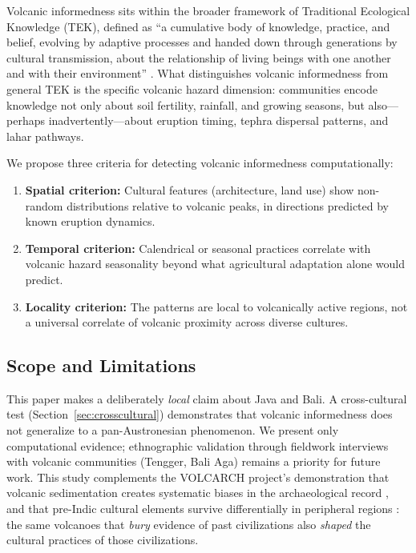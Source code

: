 \documentclass[12pt,a4paper]{article}
\begin{document}
Volcanic informedness sits within the broader framework of Traditional Ecological Knowledge (TEK), defined as ``a cumulative body of knowledge, practice, and belief, evolving by adaptive processes and handed down through generations by cultural transmission, about the relationship of living beings with one another and with their environment'' \citep{berkes2018}. What distinguishes volcanic informedness from general TEK is the specific volcanic hazard dimension: communities encode knowledge not only about soil fertility, rainfall, and growing seasons, but also---perhaps inadvertently---about eruption timing, tephra dispersal patterns, and lahar pathways.

We propose three criteria for detecting volcanic informedness computationally:
\begin{enumerate}
    \item \textbf{Spatial criterion:} Cultural features (architecture, land use) show non-random distributions relative to volcanic peaks, in directions predicted by known eruption dynamics.
    \item \textbf{Temporal criterion:} Calendrical or seasonal practices correlate with volcanic hazard seasonality beyond what agricultural adaptation alone would predict.
    \item \textbf{Locality criterion:} The patterns are local to volcanically active regions, not a universal correlate of volcanic proximity across diverse cultures.
\end{enumerate}

\subsection{Scope and Limitations}

This paper makes a deliberately \emph{local} claim about Java and Bali. A cross-cultural test (Section~\ref{sec:crosscultural}) demonstrates that volcanic informedness does not generalize to a pan-Austronesian phenomenon. We present only computational evidence; ethnographic validation through fieldwork interviews with volcanic communities (Tengger, Bali Aga) remains a priority for future work. This study complements the VOLCARCH project's demonstration that volcanic sedimentation creates systematic biases in the archaeological record \citep{amien2026p1}, and that pre-Indic cultural elements survive differentially in peripheral regions \citep{amien2026p9}: the same volcanoes that \emph{bury} evidence of past civilizations also \emph{shaped} the cultural practices of those civilizations.
\end{document}

